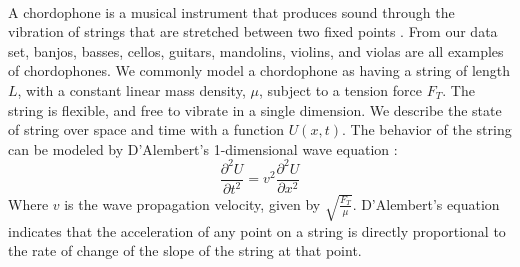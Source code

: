\documentclass[12pt,letterpaper]{article}
\begin{document}
\paragraph*{}A chordophone is a musical instrument that produces sound through the vibration of strings that are stretched between two fixed points \cite{Hornbostel}. From our data set, banjos, basses, cellos, guitars, mandolins, violins, and violas are all examples of chordophones. We commonly model a chordophone as having a string of length $L$, with a constant linear mass density, $\mu$, subject to a tension force $F_T$. The string is flexible, and free to vibrate in a single dimension. We describe the state of string over space and time with a function $U(x,t)$. The behavior of the string can be modeled by D'Alembert's 1-dimensional wave equation \cite{Haberman,Hunter,Taylor}:
\begin{equation}
\label{eqn-1DWaveEqn}
\frac{\partial^2 U}{\partial t^2} = v^2 \frac{\partial^2 U}{\partial x^2}
\end{equation}
Where $v$ is the wave propagation velocity, given by $\sqrt{\frac{F_T}{\mu}}$. D'Alembert's equation indicates that the acceleration of any point on a string is directly proportional to the rate of change of the slope of the string at that point. 
\end{document}
